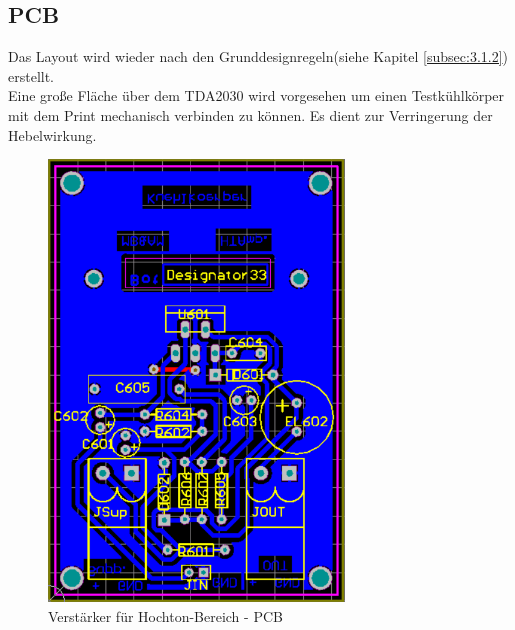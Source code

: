\subsection{PCB}\label{subsec:4.5.3}
Das Layout wird wieder nach den Grunddesignregeln(siehe Kapitel \ref{subsec:3.1.2}) erstellt.\\
Eine große Fläche über dem TDA2030 wird vorgesehen um einen Testkühlkörper mit dem Print mechanisch verbinden zu können.
Es dient zur Verringerung der Hebelwirkung.

\begin{figure} [H]
	\centering	
	\includegraphics[width=0.7\textwidth]{img/Print6/HTVerstaerker-PCB.PNG}
	\caption{Verstärker für Hochton-Bereich - PCB}
	\label {fig:4.5.3.1}
\end{figure}

